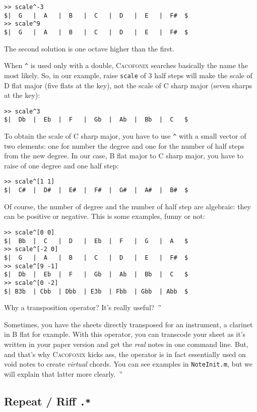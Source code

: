 \documentclass{article}
\newcommand{\cacofonix}{\textsc{Cacofonix}\xspace}
\newcommand{\file}[1]{\texttt{#1}\xspace}
\newcommand{\noteInitFile}{\file{NoteInit.m}}
\newenvironment{meenv}{ \par \noindent \makebox[6em][r]{ \textcolor{mecolor}{Me}: `` --~}}{~''}
\newenvironment{myselfenv}{ \par \noindent \makebox[6em][r]{ \textcolor{myselfcolor}{Myself}: `` --~}}{~''}
\newcommand{\me}[1]{\begin{meenv}#1\end{meenv}}
\newcommand{\myself}[1]{\begin{myselfenv}#1\end{myselfenv}}
\begin{document}
\begin{lstlisting}
>> scale^-3
$|  G   |  A   |  B   |  C   |  D   |  E   |  F#  $
>> scale^9
$|  G   |  A   |  B   |  C   |  D   |  E   |  F#  $
\end{lstlisting}
The second solution is one octave higher than the first.

When \lstinline!^! is used only with a double, \cacofonix searches basically the name the most likely. So, in our example, raise \lstinline!scale! of $3$ half steps will make the scale of D flat major (five flats at the key), not the scale of C sharp major (seven sharps at the key):
\begin{lstlisting}
>> scale^3
$|  Db  |  Eb  |  F   |  Gb  |  Ab  |  Bb  |  C   $
\end{lstlisting}
To obtain the scale of C sharp major, you have to use \lstinline!^! with a small vector of two elements: one for number the degree and one for the number of half steps from the new degree. In our case, B flat major to C sharp major, you have to raise of one degree and one half step:
\begin{lstlisting}
>> scale^[1 1]
$|  C#  |  D#  |  E#  |  F#  |  G#  |  A#  |  B#  $
\end{lstlisting}
Of course, the number of degree and the number of half step are algebraic: they can be positive or negative. This is some examples, funny or not:
\begin{lstlisting}
>> scale^[0 0]
$|  Bb  |  C   |  D   |  Eb  |  F   |  G   |  A   $
>> scale^[-2 0]
$|  G   |  A   |  B   |  C   |  D   |  E   |  F#  $
>> scale^[9 -1]
$|  Db  |  Eb  |  F   |  Gb  |  Ab  |  Bb  |  C   $
>> scale^[0 -2]
$| B3b  | Cbb  | Dbb  | E3b  | Fbb  | Gbb  | Abb  $
\end{lstlisting}

\me{Why a transposition operator? It's really useful?}
\myself{Sometimes, you have the sheets directly transposed for an instrument, a clarinet in B flat for example. With this operator, you can transcode your sheet as it's written in your paper version and get the \emph{real} notes in one command line. But, and that's why \cacofonix kicks ass, the operator is in fact essentially used on void notes to create \emph{virtual} chords. You can see examples in \noteInitFile, but we will explain that latter more clearly.}

\subsection{Repeat / Riff \lstinline!.*!}
\label{sec:RepeatRiff}
\end{document}
